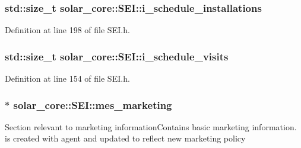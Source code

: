 \hypertarget{classsolar__core_1_1_s_e_i_ad906dcd5b638e405a7daf14539096377}{}
\subsubsection[{i\+\_\+schedule\+\_\+installations}]{\setlength{\rightskip}{0pt plus 5cm}std\+::size\+\_\+t solar\+\_\+core\+::\+S\+E\+I\+::i\+\_\+schedule\+\_\+installations\hspace{0.3cm}{\ttfamily [protected]}}\label{classsolar__core_1_1_s_e_i_ad906dcd5b638e405a7daf14539096377}


Definition at line 198 of file S\+E\+I.\+h.

\hypertarget{classsolar__core_1_1_s_e_i_a3ff238346bd126ee39aa37bfee41be43}{}
\subsubsection[{i\+\_\+schedule\+\_\+visits}]{\setlength{\rightskip}{0pt plus 5cm}std\+::size\+\_\+t solar\+\_\+core\+::\+S\+E\+I\+::i\+\_\+schedule\+\_\+visits\hspace{0.3cm}{\ttfamily [protected]}}\label{classsolar__core_1_1_s_e_i_a3ff238346bd126ee39aa37bfee41be43}


Definition at line 154 of file S\+E\+I.\+h.

\hypertarget{classsolar__core_1_1_s_e_i_a2092c19659e7acd194ac326ba6fbdc29}{}
\subsubsection[{mes\+\_\+marketing}]{$\ast$ solar\+\_\+core\+::\+S\+E\+I\+::mes\+\_\+marketing\hspace{0.3cm}{\ttfamily [protected]}}\label{classsolar__core_1_1_s_e_i_a2092c19659e7acd194ac326ba6fbdc29}
Section relevant to marketing information\+Contains basic marketing information. is created with agent and updated to reflect new marketing policy 

